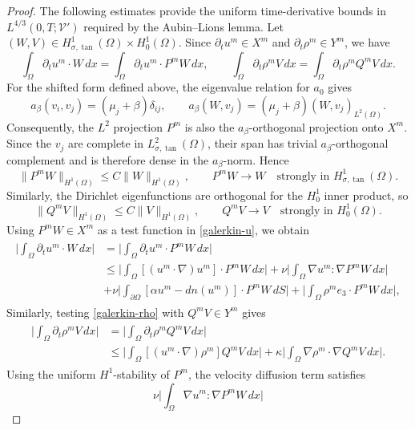 \documentclass[11pt,reqno]{amsart}
\theoremstyle{plain}
\numberwithin{equation}{section}
\begin{document}
\begin{proof}
The following estimates provide the uniform time-derivative bounds in
$L^{4/3}(0,T;\mathcal V')$ required by the Aubin--Lions lemma.
Let $(W,V)\in H^1_{\sigma,\tan}(\Omega)\times H^1_0(\Omega)$. Since $\partial_t u^m\in X^m$ and $\partial_t \rho^m\in Y^m$, we have
\[
\int_\Omega \partial_tu^m\cdot W\,dx
=
\int_\Omega \partial_tu^m\cdot P^mW\,dx,
\qquad
\int_\Omega \partial_t\rho^m V\,dx
=
\int_\Omega \partial_t\rho^m Q^mV\,dx.
\]
For the shifted form defined above, the eigenvalue relation for $a_0$ gives
\[
a_\beta(v_i,v_j)=(\mu_j+\beta)\delta_{ij},
\qquad
a_\beta(W,v_j)=(\mu_j+\beta)(W,v_j)_{L^2(\Omega)}.
\]
Consequently, the $L^2$ projection $P^m$ is also the $a_\beta$-orthogonal projection onto $X^m$. Since the $v_j$ are complete in $L^2_{\sigma,\tan}(\Omega)$, their span has trivial $a_\beta$-orthogonal complement and is therefore dense in the $a_\beta$-norm. Hence
\[
\|P^mW\|_{H^1(\Omega)}\le C\|W\|_{H^1(\Omega)},
\qquad
P^mW\to W\quad\text{strongly in }H^1_{\sigma,\tan}(\Omega).
\]
Similarly, the Dirichlet eigenfunctions are orthogonal for the $H^1_0$ inner product, so
\[
\|Q^mV\|_{H^1(\Omega)}\le C\|V\|_{H^1(\Omega)},
\qquad
Q^mV\to V\quad\text{strongly in }H^1_0(\Omega).
\]
Using \(P^mW\in X^m\) as a test function in
\eqref{galerkin-u}, we obtain
\begin{align*}
\begin{split}
\bigg|\int_{\Omega}\partial_tu^m\cdot W\,dx\bigg|&=\bigg|\int_{\Omega}\partial_tu^m\cdot P^mW\,dx\bigg|\\
&\le \bigg|\int_\Omega[(u^m\cdot\nabla)u^m]\cdot P^mW\,dx\bigg|
+\nu\bigg|\int_\Omega \nabla u^m:\nabla P^mW\,dx\bigg|\\
&+\nu\bigg|\int_{\partial\Omega}[\alpha u^m-d{n}(u^m)]\cdot P^mW\,dS\bigg|+\bigg|\int_\Omega\rho^m e_3\cdot P^mW\,dx\bigg|,
\end{split}
\end{align*}
Similarly, testing \eqref{galerkin-rho} with
\(Q^mV\in Y^m\) gives
\begin{align*}
\begin{split}
\bigg|\int_{\Omega}\partial_t\rho^m V\,dx\bigg|&=\bigg|\int_{\Omega}\partial_t\rho^m Q^mV\,dx\bigg|\\
&\le\bigg|\int_{\Omega}[(u^m\cdot\nabla)\rho^m] Q^mV\,dx\bigg|+\kappa\bigg|\int_{\Omega}\nabla\rho^m\cdot\nabla Q^mV\,dx\bigg|.
\end{split}
\end{align*}
Using the uniform \(H^1\)-stability of \(P^m\), the velocity diffusion term
satisfies
\[
\nu\bigg|\int_\Omega \nabla u^m:\nabla P^mW\,dx\bigg|
\]
\end{proof}
\end{document}
